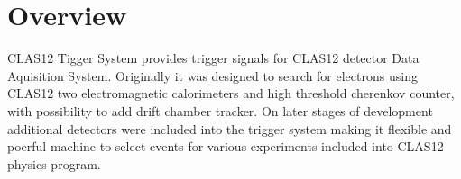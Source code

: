 \section{Overview}

CLAS12 Tigger System provides trigger signals for CLAS12 detector Data Aquisition System\cite{einstein}. Originally it was designed to search for electrons using CLAS12 two electromagnetic calorimeters and high threshold cherenkov counter, with possibility to add drift chamber tracker. On later stages of development additional detectors were included into the trigger system making it flexible and poerful machine to select events for various experiments included into CLAS12 physics program.



